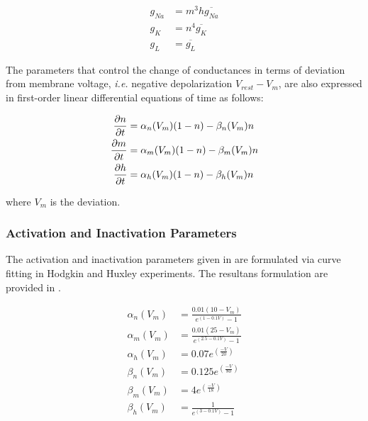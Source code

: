 \documentclass{IEEEtran}
\begin{document}
\begin{align}
    g_{Na} &= m^3h \overline{g_{Na}} \label{eq:g1}\\
    g_{K} &= n^4 \overline{g_K} \label{eq:g2}\\
    g_{L} &= \overline{g_{L}}\label{eq:g3}
\end{align}

The parameters that control the change of conductances in terms of deviation from membrane voltage, \textit{i.e.} negative depolarization $V_{rest} - V_m$, are also expressed in first-order linear differential equations of time as follows:

\begin{align}
    \pdv{n}{t} &= \alpha_n(V_m)(1-n) - \beta_n(V_m)n \label{eqn:pdv1}\\
    \pdv{m}{t} &= \alpha_m(V_m)(1-n) - \beta_m(V_m)n \label{eqn:pdv2}\\
    \pdv{h}{t} &= \alpha_h(V_m)(1-n) - \beta_h(V_m)n \label{eqn:pdv3}
\end{align}

where $V_m$ is the deviation. \\

\subsubsection*{Activation and Inactivation Parameters}
The activation and inactivation parameters given in  are formulated via curve fitting in Hodgkin and Huxley experiments. The resultans formulation are provided in .

\begin{align}
    \alpha_n(V_m) &= \frac{0.01(10-V_m)}{e^{(1-0.1V)}-1} \label{eqn:a1}\\
    \alpha_m(V_m) &= \frac{0.01(25-V_m)}{e^{(2.5-0.1V)}-1} \label{eqn:a2}\\
    \alpha_h(V_m) &= 0.07e^{(\frac{-V}{20})} \label{eqn:a3}\\
    \beta_n(V_m) &= 0.125e^{(\frac{-V}{80})} \label{eqn:b1}\\
    \beta_m(V_m) &= 4e^{(\frac{-V}{18})} \label{eqn:b2}\\
    \beta_h(V_m) &= \frac{1}{e^{(3-0.1V)}-1} \label{eqn:b3}
\end{align}
\\
\\
\end{document}
